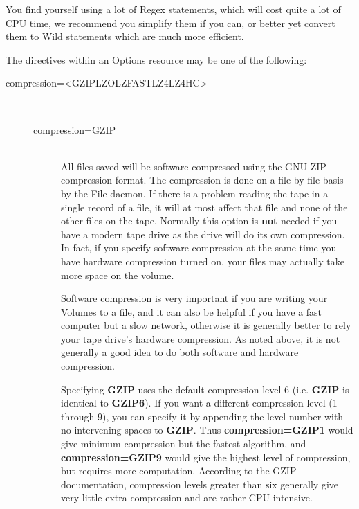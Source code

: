 You find yourself using a lot of Regex statements, which will cost quite a lot
of CPU time, we recommend you simplify them if you can, or better yet
convert them to Wild statements which are much more efficient.

The directives within an Options resource may be one of the following:

\begin{description}
    \item [compression={\textless}GZIP{\textbar}LZO{\textbar}LZFAST{\textbar}LZ4{\textbar}LZ4HC{\textgreater}] \hfill \\
    \begin{description}
        \item [compression=GZIP] \hfill \\
        All files saved will be software compressed using the GNU ZIP
        compression format.  The compression is done on a file by file basis by
        the File daemon.  If there is a problem reading the tape in a single
        record of a file, it will at most affect that file and none of the other
        files on the tape.  Normally this option is {\bf not} needed if you have
        a modern tape drive as the drive will do its own compression.  In fact,
        if you specify software compression at the same time you have hardware
        compression turned on, your files may actually take more space on the
        volume.

        Software compression is very important if you are writing your Volumes
        to a file, and it can also be helpful if you have a fast computer but a
        slow network, otherwise it is generally better to rely your tape drive's
        hardware compression.  As noted above, it is not generally a good idea
        to do both software and hardware compression.

        Specifying {\bf GZIP} uses the default compression level 6 (i.e.  {\bf
        GZIP} is identical to {\bf GZIP6}).  If you want a different compression
        level (1 through 9), you can specify it by appending the level number
        with no intervening spaces to {\bf GZIP}.  Thus {\bf compression=GZIP1}
        would give minimum compression but the fastest algorithm, and {\bf
        compression=GZIP9} would give the highest level of compression, but
        requires more computation.  According to the GZIP documentation,
        compression levels greater than six generally give very little extra
        compression and are rather CPU intensive.


\end{description}
\end{description}
